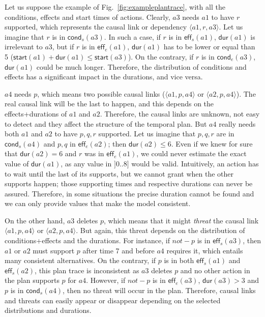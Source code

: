 \documentclass[runningheads]{llncs}
\newcommand{\tup}[1]{{\langle #1 \rangle}}
\newcommand{\eff}{\mathsf{eff}}    %
\newcommand{\cond}{\mathsf{cond}}  %
\newcommand{\dur}{\mathsf{dur}}    %
\newcommand{\start}{\mathsf{start}}%
\begin{document}
Let us suppose the example of Fig.~\ref{fig:exampleplantrace}, with all the conditions, effects and start times of actions. Clearly, $a3$ needs $a1$ to have $r$ supported, which represents the causal link or dependency $\tup{a1,r,a3}$. Let us imagine that $r$ is in $\cond_s(a3)$. In such a case, if $r$ is in $\eff_s(a1)$, $\dur(a1)$ is irrelevant to $a3$, but if $r$ is in $\eff_e(a1)$, $\dur(a1)$ has to be lower or equal than 5 ($\start(a1)+\dur(a1) \leq \start(a3)$). On the contrary, if $r$ is in $\cond_e(a3)$, $\dur(a1)$ could be much longer. Therefore, the distribution of conditions and effects has a significant impact in the durations, and vice versa.

$a4$ needs $p$, which means two possible causal links ($\tup{a1,p,a4}$ or $\tup{a2,p,a4}$). The real causal link will be the last to happen, and this depends on the effects+durations of $a1$ and $a2$. Therefore, the causal links are unknown, not easy to detect and they affect the structure of the temporal plan. But $a4$ really needs both $a1$ and $a2$ to have $p,q,r$ supported. Let us imagine that $p,q,r$ are in $\cond_s(a4)$ and $p,q$ in $\eff_e(a2)$; then $\dur(a2) \leq 6$. Even if we knew for sure that $\dur(a2)=6$ and $r$ was in $\eff_e(a1)$, we could never estimate the exact value of $\dur(a1)$, as any value in $]0..8]$ would be valid. Intuitively, an action has to wait until the last of its supports, but we cannot grant when the other supports happen; those supporting times and respective durations can never be assured. Therefore, in some situations the precise duration cannot be found and we can only provide values that make the model consistent.

On the other hand, $a3$ deletes $p$, which means that it might \emph{threat} the causal link $\tup{a1,p,a4}$ or $\tup{a2,p,a4}$. But again, this threat depends on the distribution of conditions+effects and the durations. For instance, if $not-p$ is in $\eff_s(a3)$, then $a1$ or $a2$ must support $p$ after time 7 and before $a4$ requires it, which entails many consistent alternatives. On the contrary, if $p$ is in both $\eff_s(a1)$ and $\eff_s(a2)$, this plan trace is inconsistent as $a3$ deletes $p$ and no other action in the plan supports $p$ for $a4$. However, if $not-p$ is in $\eff_e(a3)$, $\dur(a3) > 3$ and $p$ is in $\cond_s(a4)$, then no threat will occur in the plan. Therefore, causal links and threats can easily appear or disappear depending on the selected distributions and durations.
\end{document}
